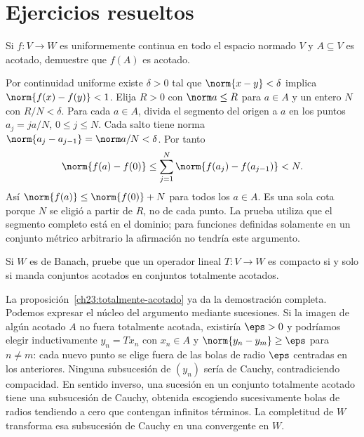 \section{Ejercicios resueltos}

\begin{ejercicio}
Si $f:V\to W$ es uniformemente continua en todo el espacio normado $V$ y $A\subseteq V$ es acotado, demuestre que $f(A)$ es acotado.
\end{ejercicio}
\begin{solucion}
Por continuidad uniforme existe $\delta>0$ tal que $\norm{x-y}<\delta$ implica $\norm{f(x)-f(y)}<1$. Elija $R>0$ con $\norm a\leq R$ para $a\in A$ y un entero $N$ con $R/N<\delta$. Para cada $a\in A$, divida el segmento del origen a $a$ en los puntos $a_j=ja/N$, $0\leq j\leq N$. Cada salto tiene norma $\norm{a_j-a_{j-1}}=\norm a/N<\delta$. Por tanto
\[
 \norm{f(a)-f(0)}\leq\sum_{j=1}^N\norm{f(a_j)-f(a_{j-1})}<N.
\]
Así $\norm{f(a)}\leq\norm{f(0)}+N$ para todos los $a\in A$. Es una sola cota porque $N$ se eligió a partir de $R$, no de cada punto. La prueba utiliza que el segmento completo está en el dominio; para funciones definidas solamente en un conjunto métrico arbitrario la afirmación no tendría este argumento.
\end{solucion}

\begin{ejercicio}
Si $W$ es de Banach, pruebe que un operador lineal $T:V\to W$ es compacto si y solo si manda conjuntos acotados en conjuntos totalmente acotados.
\end{ejercicio}
\begin{solucion}
La proposición~\ref{ch23:totalmente-acotado} ya da la demostración completa. Podemos expresar el núcleo del argumento mediante sucesiones. Si la imagen de algún acotado $A$ no fuera totalmente acotada, existiría $\eps>0$ y podríamos elegir inductivamente $y_n=Tx_n$ con $x_n\in A$ y $\norm{y_n-y_m}\geq\eps$ para $n\ne m$: cada nuevo punto se elige fuera de las bolas de radio $\eps$ centradas en los anteriores. Ninguna subsucesión de $(y_n)$ sería de Cauchy, contradiciendo compacidad. En sentido inverso, una sucesión en un conjunto totalmente acotado tiene una subsucesión de Cauchy, obtenida escogiendo sucesivamente bolas de radios tendiendo a cero que contengan infinitos términos. La completitud de $W$ transforma esa subsucesión de Cauchy en una convergente en $W$.
\end{solucion}


